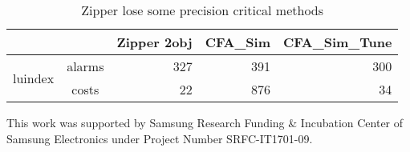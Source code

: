 \documentclass[acmsmall, screen]{acmart}
\begin{document}
\maketitle







\appendix

\begin{table}[]
	\begin{tabular}{|c|c|r|r|r|}
		\hline
		&        & \multicolumn{1}{c|}{Zipper 2obj} & \multicolumn{1}{c|}{CFA\_Sim} & \multicolumn{1}{c|}{CFA\_Sim\_Tune} \\ \hline
		\multirow{2}{*}{luindex} & alarms & 327                              & 391                           & 300                                 \\ \cline{2-5} 
		& costs  & 22                               & 876                           & 34                                  \\ \hline
	\end{tabular}
	\caption{Zipper lose some precision critical methods}
\end{table}
\begin{comment}

{\sf \color{blue}{TODO}}:
\begin{itemize}
\item Definition of flavor for sobj
\begin{align*}
 & \parentsobj (\heap, \hctx, {\it invo}, \ctx) =
\begin{cases}
\parentcall (\heap, \hctx, {\it invo}, \ctx)&\text{$\cdots$} heap = \perp\\
\parentobj (\heap, \hctx, {\it invo}, \ctx)&\text{$\cdots$} otherwise
\end{cases}
\end{align*}
\item Application to $k\ge 2$ \\
\end{itemize}
\end{comment}


\begin{acks}
This work was supported by Samsung Research Funding \& Incubation Center of Samsung Electronics under Project Number SRFC-IT1701-09.
\end{acks}




%
\end{document}
